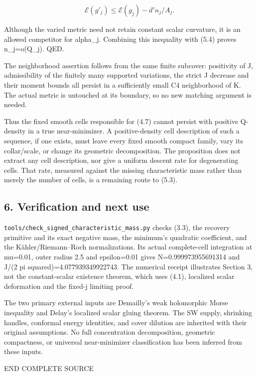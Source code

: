 \documentclass[
  10pt,
]{article}
\begin{document}
\[
 \mathcal E(g'_j)\le\mathcal E(g_j)-d' n_j/A_j.
\]

Although the varied metric need not retain constant scalar curvature, it
is an allowed competitor for alpha\_j. Combining this inequality with
(5.4) proves n\_j=o(Q\_j). QED.

The neighborhood assertion follows from the same finite subcover:
positivity of J, admissibility of the finitely many supported
variations, the strict J decrease and their moment bounds all persist in
a sufficiently small C4 neighborhood of K. The actual metric is
untouched at its boundary, so no new matching argument is needed.

Thus the fixed smooth cells responsible for (4.7) cannot persist with
positive Q-density in a true near-minimizer. A positive-density cell
description of such a sequence, if one exists, must leave every fixed
smooth compact family, vary its collar/scale, or change its geometric
decomposition. The proposition does not extract any cell description,
nor give a uniform descent rate for degenerating cells. That rate,
measured against the missing characteristic mass rather than merely the
number of cells, is a remaining route to (5.3).

\hypertarget{verification-and-next-use}{%
\subsection{6. Verification and next
use}\label{verification-and-next-use}}

\nolinkurl{tools/check_signed_characteristic_mass.py} checks (3.3), the
recovery primitive and its exact negative mass, the minimum's quadratic
coefficient, and the Kähler/Riemann--Roch normalizations. Its actual
complete-cell integration at mu=0.01, outer radius 2.5 and epsilon=0.01
gives N=0.999973955691314 and J/(2 pi squared)=4.077939349922743. The
numerical receipt illustrates Section 3, not the constant-scalar
existence theorem, which uses (4.1), localized scalar deformation and
the fixed-j limiting proof.

The two primary external inputs are Demailly's weak holomorphic Morse
inequality and Delay's localized scalar gluing theorem. The SW supply,
shrinking handles, conformal energy identities, and cover dilution are
inherited with their original assumptions. No full concentration
decomposition, geometric compactness, or universal near-minimizer
classification has been inferred from these inputs.

END COMPLETE SOURCE
\end{document}
